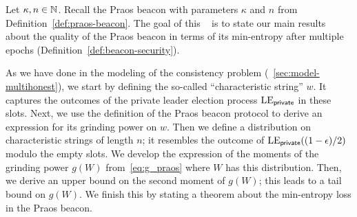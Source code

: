 

Let $\kappa, n \in \mathbb{N}$. 
Recall the Praos beacon with parameters $\kappa$ and $n$ from Definition~\ref{def:praos-beacon}. 
The goal of this \Section~
is to state our main results 
about the quality of the Praos beacon 
in terms of its min-entropy after multiple epochs (Definition~\ref{def:beacon-security}).

As we have done in the modeling of the consistency problem 
(\Section~\ref{sec:model-multihonest}), 
we start by defining the so-called ``characteristic string'' $w$. 
It captures the outcomes of the private leader election process $\mathrm{LE}_\mathsf{private}$ 
in these slots. 
Next, we use the definition of the Praos beacon protocol to 
derive an expression for its grinding power on $w$.
Then we define a distribution on characteristic strings of length $n$; 
it resembles the outcome of $\mathrm{LE}_\mathsf{private}((1-\epsilon)/2)$ 
modulo the empty slots. 
We develop the expression of the moments of the 
grinding power $g(W)$ from~\eqref{eq:g_praos} 
where $W$ has this distribution. 
Then, we derive an upper bound on the second moment of $g(W)$;
this leads to a  tail bound on $g(W)$.
We finish this \Section by stating a theorem about the min-entropy loss in the Praos beacon. 





\newcommand{\Suffix}[2]{ \mathsf{suffix}({#1},{#2})}
\newcommand{\CoinTossingLC}{\Pi_\mathsf{lc}^{\Players(\alpha),k,n}}






